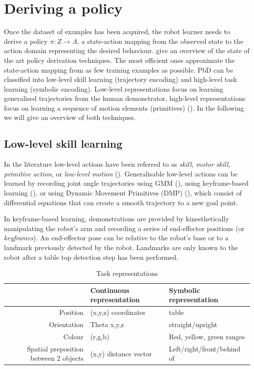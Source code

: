 \section{Deriving a policy}\label{subsec:Deriving a policy}

Once the dataset of examples has been acquired, the robot learner needs to derive a policy $\pi : Z \rightarrow A$, a state-action mapping from the observed state to the action domain representing the desired behaviour. 
\cite{chernova2014robot} give an overview of the state of the art policy derivation techniques.
The most efficient ones approximate the state-action mapping from as few training examples as possible.
PbD can be classified into low-level skill learning (trajectory encoding) and high-level task learning (symbolic encoding).
Low-level representations focus on learning generalised trajectories from the human demonstrator, high-level representations focus on learning a sequence of motion elements (primitives) (\cite{peppoloni2014ros}). In the following we will give an overview of both techniques.


\subsection{Low-level skill learning}
In the literature low-level actions have been referred to as \textit{skill, motor skill, primitive action,} or \textit{low-level motion} (\cite{chernova2014robot}).
Generalisable low-level actions can be learned by recording joint angle trajectories using GMM (\cite{billard2008robot}), using keyframe-based learning (\cite{akgun2012keyframe}), or using Dynamic Movement Primitives (DMP) (\cite{pastor2009learning}), which consist of differential equations that can create a smooth trajectory to a new goal point.

In keyframe-based learning, demonstrations are provided by kinesthetically manipulating the robot's arm and recording a series of end-effector positions (or \textit{keyframes}). 
An end-effector pose can be relative to the robot's base or to a landmark previously detected by the robot.
Landmarks are only known to the robot after a table top detection step has been performed.

\begin{table}[ht]
\centering
\caption{Task representations}
\label{tab:representations}
\begin{tabular}{r|ll}
 & Continuous representation & Symbolic representation\\ \hline
Position & (x,y,z) coordinates & table \\
Orientation  & Theta x,y,z  & straight/upright \\
Colour & (r,g,b) & Red, yellow, green ranges\\
Spatial preposition between 2 objects & (x,y) distance vector & Left/right/front/behind of 
\end{tabular}
\end{table}

